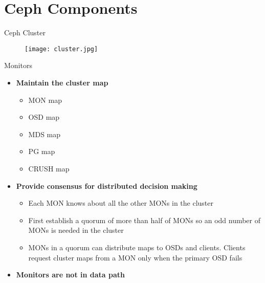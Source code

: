 \section{Ceph Components}

\begin{frame}{Ceph Cluster}
    \begin{figure}[htpb]
        \centering
        \texttt{[image: cluster.jpg]}
    \end{figure}
\end{frame}

\begin{frame}{Monitors}
    \begin{itemize}
        \item \textbf{Maintain the cluster map}
            \begin{itemize}
                \item MON map
                \item OSD map
                \item MDS map
                \item PG map
                \item CRUSH map
            \end{itemize}
        \item \textbf{Provide consensus for distributed decision making}
            \begin{itemize}
                \item Each MON knows about all the other MONs in the cluster
                \item First establish a quorum of more than half of MONs so an odd number of MONs is needed in the cluster
                \item MONs in a quorum can distribute maps to OSDs and clients. Clients request cluster maps from a MON only when the primary OSD fails
            \end{itemize}
        \item \textbf{Monitors are not in data path} 
    \end{itemize}
\end{frame}


